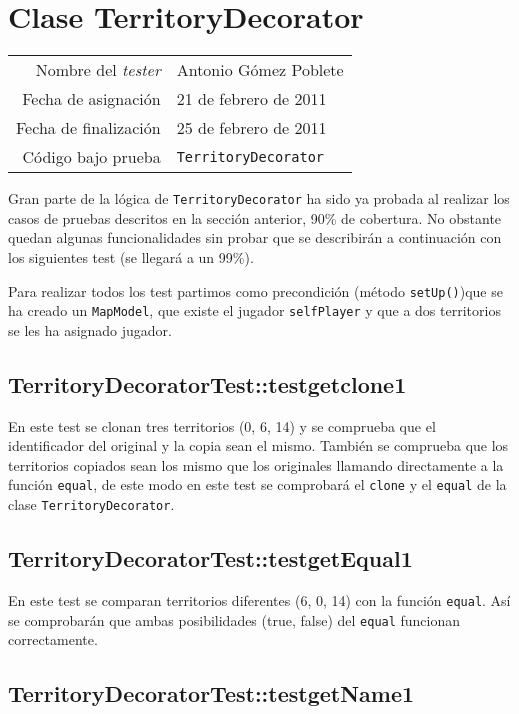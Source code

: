 \section{Clase TerritoryDecorator}

{\small
\begin{tabular}{r|l}
Nombre del \textit{tester} & Antonio Gómez Poblete \\
Fecha de asignación & 21 de febrero de 2011 \\
Fecha de finalización & 25 de febrero de 2011 \\
Código bajo prueba & \texttt{TerritoryDecorator}
\end{tabular}
}

Gran parte de la lógica  de \texttt{TerritoryDecorator} ha sido ya probada al realizar los casos de pruebas descritos en la sección anterior, 90\% de cobertura.
No obstante quedan algunas funcionalidades sin probar que se describirán a continuación con los siguientes test (se llegará a un 99\%). 

Para realizar todos los test partimos como precondición (método \texttt{setUp()})que se ha creado un \texttt{MapModel}, que existe el jugador \texttt{selfPlayer} y que a dos territorios se les ha asignado jugador.  

\subsection{TerritoryDecoratorTest::testgetclone1}

En este test se clonan tres territorios (0, 6, 14) y se comprueba que el identificador del original y la copia sean el mismo. También se comprueba que los territorios copiados sean los mismo que los originales llamando directamente a la función \texttt{equal}, de  este modo en este  test se comprobará  el \texttt{clone} y el \texttt{equal} de la clase \texttt{TerritoryDecorator}.


\subsection{TerritoryDecoratorTest::testgetEqual1}

En este test se comparan  territorios diferentes (6, 0, 14) con la función \texttt{equal}. Así se comprobarán que ambas posibilidades (true, false) del \texttt{equal} funcionan correctamente.
 
\subsection{TerritoryDecoratorTest::testgetName1} 

